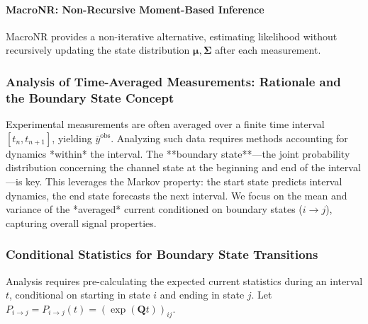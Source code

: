 \documentclass[pdflatex,sn-nature]{sn-jnl}%
\begin{document}
\paragraph{MacroNR: Non-Recursive Moment-Based Inference}
MacroNR \cite{Milescu, Moffatt} provides a non-iterative alternative, estimating likelihood without recursively updating the state distribution \(\boldsymbol{\mu}, \boldsymbol{\Sigma}\) after each measurement.

\subsubsection{Analysis of Time-Averaged Measurements: Rationale and the Boundary State Concept}
\label{sec:boundary_state_concept}
Experimental measurements are often averaged over a finite time interval \([t_n, t_{n+1}]\), yielding \(\overline{y}^{\text{obs}}\). Analyzing such data requires methods accounting for dynamics *within* the interval. The **boundary state**—the joint probability distribution concerning the channel state at the beginning and end of the interval—is key. This leverages the Markov property: the start state predicts interval dynamics, the end state forecasts the next interval. We focus on the mean and variance of the *averaged* current conditioned on boundary states (\(i \rightarrow j\)), capturing overall signal properties.

\subsubsection{Conditional Statistics for Boundary State Transitions}
\label{sec:conditional_stats}
Analysis requires pre-calculating the expected current statistics during an interval \(t\), conditional on starting in state \(i\) and ending in state \(j\). Let \(P_{i\rightarrow j} = P_{i\rightarrow j}(t) = (\exp(\boldsymbol{Q}t))_{ij}\).
\end{document}
